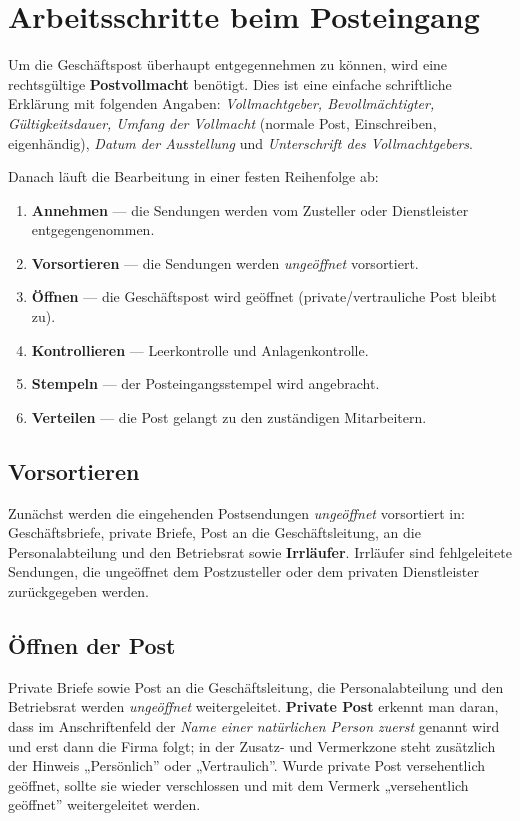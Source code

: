 \documentclass[11pt, a4paper]{article}
\begin{document}
\section{Arbeitsschritte beim Posteingang}

Um die Geschäftspost überhaupt entgegennehmen zu können, wird eine rechtsgültige
\textbf{Postvollmacht} benötigt. Dies ist eine einfache schriftliche Erklärung mit folgenden
Angaben: \emph{Vollmachtgeber, Bevollmächtigter, Gültigkeitsdauer, Umfang der Vollmacht}
(normale Post, Einschreiben, eigenhändig), \emph{Datum der Ausstellung} und \emph{Unterschrift
des Vollmachtgebers}.

Danach läuft die Bearbeitung in einer festen Reihenfolge ab:

\begin{enumerate}
  \item \textbf{Annehmen} --- die Sendungen werden vom Zusteller oder Dienstleister entgegengenommen.
  \item \textbf{Vorsortieren} --- die Sendungen werden \emph{ungeöffnet} vorsortiert.
  \item \textbf{Öffnen} --- die Geschäftspost wird geöffnet (private/vertrauliche Post bleibt zu).
  \item \textbf{Kontrollieren} --- Leerkontrolle und Anlagenkontrolle.
  \item \textbf{Stempeln} --- der Posteingangsstempel wird angebracht.
  \item \textbf{Verteilen} --- die Post gelangt zu den zuständigen Mitarbeitern.
\end{enumerate}

\subsection{Vorsortieren}

Zunächst werden die eingehenden Postsendungen \emph{ungeöffnet} vorsortiert in:
Geschäftsbriefe, private Briefe, Post an die Geschäftsleitung, an die Personalabteilung und
den Betriebsrat sowie \textbf{Irrläufer}. Irrläufer sind fehlgeleitete Sendungen, die
ungeöffnet dem Postzusteller oder dem privaten Dienstleister zurückgegeben werden.

\subsection{Öffnen der Post}

Private Briefe sowie Post an die Geschäftsleitung, die Personalabteilung und den Betriebsrat
werden \emph{ungeöffnet} weitergeleitet. \textbf{Private Post} erkennt man daran, dass im
Anschriftenfeld der \emph{Name einer natürlichen Person zuerst} genannt wird und erst dann die
Firma folgt; in der Zusatz- und Vermerkzone steht zusätzlich der Hinweis „Persönlich” oder
„Vertraulich”. Wurde private Post versehentlich geöffnet, sollte sie wieder verschlossen und
mit dem Vermerk „versehentlich geöffnet” weitergeleitet werden.
\end{document}
